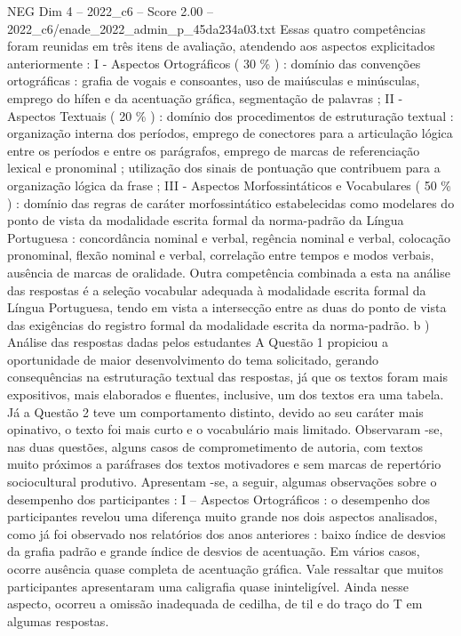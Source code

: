 \begin{textsample}{NEG Dim 4 – 2022\_c6 – Score 2.00 – 2022\_c6/enade\_2022\_admin\_p\_45da234a03.txt}
Essas quatro competências foram reunidas em três itens de avaliação, atendendo aos aspectos explicitados anteriormente : I - Aspectos Ortográficos ( 30 \% ) : domínio das convenções ortográficas : grafia de vogais e consoantes, uso de maiúsculas e minúsculas, emprego do hífen e da acentuação gráfica, segmentação de palavras ; II - Aspectos Textuais ( 20 \% ) : domínio dos procedimentos de estruturação textual : organização interna dos períodos, emprego de conectores para a articulação lógica entre os períodos e entre os parágrafos, emprego de marcas de referenciação lexical e pronominal ; utilização dos sinais de pontuação que contribuem para a organização lógica da frase ; III - Aspectos Morfossintáticos e Vocabulares ( 50 \% ) : domínio das regras de caráter morfossintático estabelecidas como modelares do ponto de vista da modalidade escrita formal da norma-padrão da Língua Portuguesa : concordância nominal e verbal, regência nominal e verbal, colocação pronominal, flexão nominal e verbal, correlação entre tempos e modos verbais, ausência de marcas de oralidade.
Outra competência combinada a esta na análise das respostas é a seleção vocabular adequada à modalidade escrita formal da Língua Portuguesa, tendo em vista a intersecção entre as duas do ponto de vista das exigências do registro formal da modalidade escrita da norma-padrão. b ) Análise das respostas dadas pelos estudantes A Questão 1 propiciou a oportunidade de maior desenvolvimento do tema solicitado, gerando consequências na estruturação textual das respostas, já que os textos foram mais expositivos, mais elaborados e fluentes, inclusive, um dos textos era uma tabela.
Já a Questão 2 teve um comportamento distinto, devido ao seu caráter mais opinativo, o texto foi mais curto e o vocabulário mais limitado.
Observaram -se, nas duas questões, alguns casos de comprometimento de autoria, com textos muito próximos a paráfrases dos textos motivadores e sem marcas de repertório sociocultural produtivo.
Apresentam -se, a seguir, algumas observações sobre o desempenho dos participantes : I – Aspectos Ortográficos : o desempenho dos participantes revelou uma diferença muito grande nos dois aspectos analisados, como já foi observado nos relatórios dos anos anteriores : baixo índice de desvios da grafia padrão e grande índice de desvios de acentuação.
Em vários casos, ocorre ausência quase completa de acentuação gráfica.
Vale ressaltar que muitos participantes apresentaram uma caligrafia quase ininteligível.
Ainda nesse aspecto, ocorreu a omissão inadequada de cedilha, de til e do traço do T em algumas respostas.

\end{textsample}
